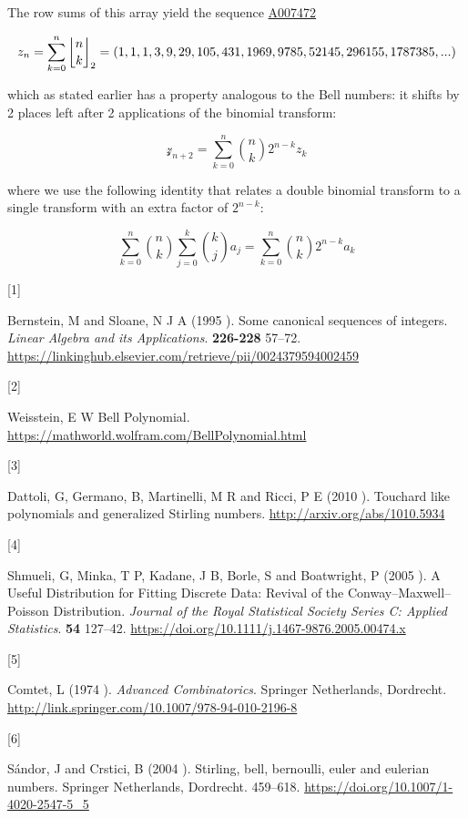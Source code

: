 \documentclass[
  letterpaper,
  DIV=11,
  numbers=noendperiod]{scrartcl}
\newlength{\cslhangindent}
\newlength{\csllabelwidth}
\newenvironment{CSLReferences}[2] %
 {\begin{list}{}{%
  \setlength{\itemindent}{0pt}
  \setlength{\leftmargin}{0pt}
  \setlength{\parsep}{0pt}
  \ifodd #1
   \setlength{\leftmargin}{\cslhangindent}
   \setlength{\itemindent}{-1\cslhangindent}
  \fi
  \setlength{\itemsep}{#2\baselineskip}}}
 {\end{list}}
\newcommand{\CSLLeftMargin}[1]{\parbox[t]{\csllabelwidth}{\strut#1\strut}}
\newcommand{\CSLRightInline}[1]{\parbox[t]{\linewidth - \csllabelwidth}{\strut#1\strut}}
\begin{document}
The row sums of this array yield the sequence
\href{https://oeis.org/A007472}{A007472}

\[
z_n = \sum_{k=0}^{n}\genfrac{\lfloor}{\rfloor}{0pt}{}{n}{k}_2 = (1, 1, 1, 3, 9, 29, 105, 431, 1969, 9785, 52145, 296155, 1787385, ...)
\]

which as stated earlier has a property analogous to the Bell numbers: it
shifts by 2 places left after 2 applications of the binomial transform:

\[
\mathscr{z}_{n+2}=\sum_{k=0}^{n}\binom{n}{k}2^{n-k}z_k
\]

where we use the following identity that relates a double binomial
transform to a single transform with an extra factor of \(2^{n-k}\):

\[
\sum_{k=0}^{n}\binom{n}{k}\sum_{j=0}^{k}\binom{k}{j}a_j = \sum_{k=0}^{n}\binom{n}{k}2^{n-k}a_k
\]

\label{refs}
\begin{CSLReferences}{0}{1}
\CSLLeftMargin{{[}1{]} }%
\CSLRightInline{Bernstein, M and Sloane, N J A (1995 ). Some canonical
sequences of integers. \emph{Linear Algebra and its Applications}.
\textbf{226-228} 57--72.
\url{https://linkinghub.elsevier.com/retrieve/pii/0024379594002459}}

\CSLLeftMargin{{[}2{]} }%
\CSLRightInline{Weisstein, E W Bell Polynomial.
\url{https://mathworld.wolfram.com/BellPolynomial.html}}

\CSLLeftMargin{{[}3{]} }%
\CSLRightInline{Dattoli, G, Germano, B, Martinelli, M R and Ricci, P E
(2010 ). Touchard like polynomials and generalized {Stirling} numbers.
\url{http://arxiv.org/abs/1010.5934}}

\CSLLeftMargin{{[}4{]} }%
\CSLRightInline{Shmueli, G, Minka, T P, Kadane, J B, Borle, S and
Boatwright, P (2005 ). A {Useful Distribution} for {Fitting Discrete
Data}: {Revival} of the {Conway}--{Maxwell}--{Poisson Distribution}.
\emph{Journal of the Royal Statistical Society Series C: Applied
Statistics}. \textbf{54} 127--42.
\url{https://doi.org/10.1111/j.1467-9876.2005.00474.x}}

\CSLLeftMargin{{[}5{]} }%
\CSLRightInline{Comtet, L (1974 ). \emph{Advanced Combinatorics}.
Springer Netherlands, Dordrecht.
\url{http://link.springer.com/10.1007/978-94-010-2196-8}}

\CSLLeftMargin{{[}6{]} }%
\CSLRightInline{Sándor, J and Crstici, B (2004 ). Stirling, bell,
bernoulli, euler and eulerian numbers. Springer Netherlands, Dordrecht.
459--618. \url{https://doi.org/10.1007/1-4020-2547-5_5}}

\end{CSLReferences}
\end{document}
